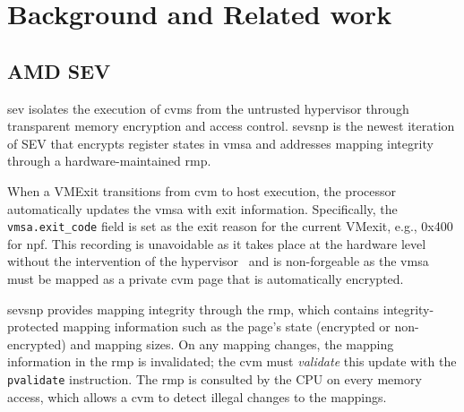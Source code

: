 
\section{Background and Related work}
\label{sec:background}

\subsection{AMD SEV} \label{sec:bg:amdsev}
\gls{sev} isolates the execution of \glspl{cvm} from the untrusted hypervisor through transparent memory encryption and access control.
\gls{sevsnp} is the newest iteration of SEV that encrypts register states in \gls{vmsa} and addresses mapping integrity through a hardware-maintained \gls{rmp}. 

When a VMExit transitions from \gls{cvm} to host execution, the processor automatically updates the \gls{vmsa} with exit information.
Specifically,  the \texttt{vmsa.exit\_code} field is set as the exit reason for the current VMexit, e.g., 0x400 for \gls{npf}.
This recording is unavoidable as it takes place at the hardware level without the intervention of the hypervisor~\cite{amd64} and is non-forgeable as the \gls{vmsa} must be mapped as a private \gls{cvm} page that is automatically encrypted.


\gls{sevsnp} provides mapping integrity through the \gls{rmp}, which contains integrity-protected mapping information such as the page's state (encrypted or non-encrypted) and mapping sizes.
On any mapping changes, the mapping information in the \gls{rmp} is invalidated; the \gls{cvm} must \emph{validate} this update with the \texttt{pvalidate} instruction.
The \gls{rmp} is consulted by the CPU on every memory access, which allows a \gls{cvm} to detect illegal changes to the mappings.

